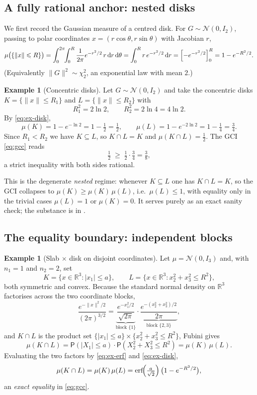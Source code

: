 \documentclass[12pt,a4paper]{article}
\theoremstyle{definition}
\newtheorem{example}[theorem]{Example}
\newcommand{\R}{\mathbb{R}}
\newcommand{\PP}{\mathsf{P}}
\newcommand{\dd}{\mathrm{d}}
\newcommand{\caln}{\mathcal{N}}
\newcommand{\erf}{\operatorname{erf}}
\begin{document}
\subsection{A fully rational anchor: nested disks}\label{sub:ex-nested}

We first record the Gaussian measure of a centred disk.  For
$G\sim\caln(0,I_2)$, passing to polar coordinates $x=(r\cos\theta,r\sin\theta)$
with Jacobian $r$,
\begin{equation}\label{eq:ex-disk}
  \mu\bigl(\{\|x\|\leqslant R\}\bigr)
  =\int_0^{2\pi}\!\!\int_0^R\frac{1}{2\pi}e^{-r^2/2}\,r\,\dd r\,\dd\theta
  =\int_0^R r\,e^{-r^2/2}\,\dd r
  =\Bigl[-e^{-r^2/2}\Bigr]_0^R
  =1-e^{-R^2/2}.
\end{equation}
(Equivalently $\|G\|^2\sim\chi^2_2$, an exponential law with mean $2$.)

\begin{example}[Concentric disks]\label{ex:nested}
  Let $G\sim\caln(0,I_2)$ and take the concentric disks
  $K=\{\|x\|\leqslant R_1\}$ and $L=\{\|x\|\leqslant R_2\}$ with
  \[
    R_1^2=2\ln 2,\qquad R_2^2=2\ln 4=4\ln 2 .
  \]
  By \eqref{eq:ex-disk},
  \[
    \mu(K)=1-e^{-\ln 2}=1-\tfrac12=\tfrac12,\qquad
    \mu(L)=1-e^{-2\ln 2}=1-\tfrac14=\tfrac34 .
  \]
  Since $R_1<R_2$ we have $K\subseteq L$, so $K\cap L=K$ and
  $\mu(K\cap L)=\tfrac12$.  The GCI \eqref{eq:gcc} reads
  \[
    \tfrac12\;\geqslant\;\tfrac12\cdot\tfrac34=\tfrac38 ,
  \]
  a strict inequality with both sides rational.
\end{example}

This is the degenerate \emph{nested} regime: whenever $K\subseteq L$ one
has $K\cap L=K$, so the GCI collapses to
$\mu(K)\geqslant\mu(K)\,\mu(L)$, i.e.\ $\mu(L)\leqslant 1$, with equality
only in the trivial cases $\mu(L)=1$ or $\mu(K)=0$.  It serves purely as an exact
sanity check; the substance is in .

\subsection{The equality boundary: independent blocks}\label{sub:ex-indep}

\begin{example}[Slab $\times$ disk on disjoint coordinates]\label{ex:indep}
  Let $\mu=\caln(0,I_3)$ and, with $n_1=1$ and $n_2=2$, set
  \[
    K=\{x\in\R^3:|x_1|\leqslant a\},\qquad
    L=\{x\in\R^3:x_2^2+x_3^2\leqslant R^2\},
  \]
  both symmetric and convex.  Because the standard normal density on
  $\R^3$ factorises across the two coordinate blocks,
  \[
    \frac{e^{-\|x\|^2/2}}{(2\pi)^{3/2}}
    =\underbrace{\frac{e^{-x_1^2/2}}{\sqrt{2\pi}}}_{\text{block }\{1\}}
     \cdot
     \underbrace{\frac{e^{-(x_2^2+x_3^2)/2}}{2\pi}}_{\text{block }\{2,3\}},
  \]
  and $K\cap L$ is the product set
  $\{|x_1|\leqslant a\}\times\{x_2^2+x_3^2\leqslant R^2\}$, Fubini gives
  \[
    \mu(K\cap L)
    =\PP(|X_1|\leqslant a)\cdot\PP(X_2^2+X_3^2\leqslant R^2)
    =\mu(K)\,\mu(L).
  \]
  Evaluating the two factors by \eqref{eq:ex-erf} and \eqref{eq:ex-disk},
  \[
    \mu(K\cap L)=\mu(K)\,\mu(L)
    =\erf\!\Bigl(\tfrac{a}{\sqrt2}\Bigr)\,\bigl(1-e^{-R^2/2}\bigr),
  \]
  an \emph{exact equality} in \eqref{eq:gcc}.
\end{example}
\end{document}
